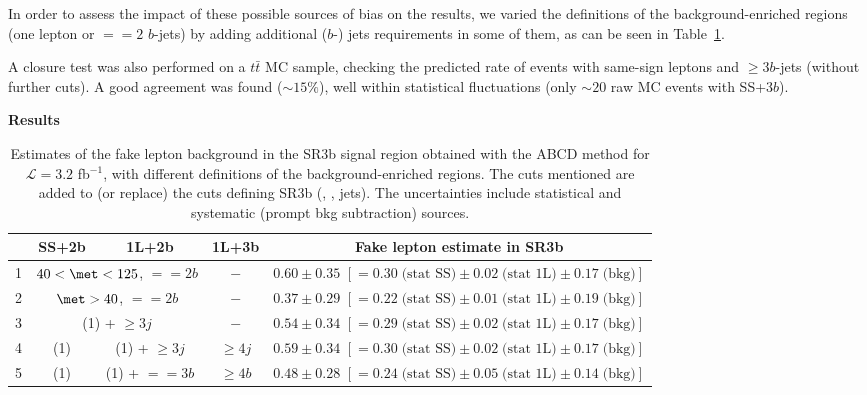 In order to assess the impact of these possible sources of bias on the results, 
we varied the definitions of the background-enriched regions (one lepton or $==2$ $b$-jets) 
by adding additional ($b$-) jets requirements in some of them, as can be seen in Table~\ref{tab:abcd_rates}. 

A closure test was also performed on a $t\bar t$ MC sample, checking the predicted rate of events 
with same-sign leptons and $\ge 3 b$-jets (without further cuts). 
A good agreement was found ($\sim 15\%$), well within statistical fluctuations (only $\sim 20$ raw MC events with SS+3$b$). 

\par{\bf Results\\}
\begin{table}[t!]
\centering
\begin{tabular}{c|c|c|c|c|}\hline
& SS+2b    & 1L+2b   &    1L+3b & Fake lepton estimate in SR3b\\\hline\hline
1 & \multicolumn{2}{c|}{$40<\met<125$, $==2b$} & $-$ & \textbf{$0.60 \pm 0.35$} $[=0.30\;\text{(stat SS)}\pm 0.02\;\text{(stat 1L)}\pm 0.17\;\text{(bkg)}]$\\\hline
2 & \multicolumn{2}{c|}{$\met>40$, $==2b$} & $-$ & \textbf{$0.37 \pm 0.29$} $[=0.22\;\text{(stat SS)}\pm 0.01\;\text{(stat 1L)}\pm 0.19\;\text{(bkg)}]$\\\hline
3 & \multicolumn{2}{c|}{(1) + $\ge 3j$} & $-$ & \textbf{$0.54 \pm 0.34$} $[=0.29\;\text{(stat SS)}\pm 0.02\;\text{(stat 1L)}\pm 0.17\;\text{(bkg)}]$\\\hline
4 & (1) & (1) + $\ge 3j$ & $\ge 4j$ & \textbf{$0.59 \pm 0.34$} $[=0.30\;\text{(stat SS)}\pm 0.02\;\text{(stat 1L)}\pm 0.17\;\text{(bkg)}]$\\\hline
5 & (1) & (1) + $==3b$ & $\ge 4 b$ & \textbf{$0.48 \pm 0.28$} $[=0.24\;\text{(stat SS)}\pm 0.05\;\text{(stat 1L)}\pm 0.14\;\text{(bkg)}]$\\\hline
\end{tabular}
\caption{Estimates of the fake lepton background in the SR3b signal region obtained with the ABCD method for $\mathcal L=3.2$ fb$^{-1}$, 
with different definitions of the background-enriched regions. 
The cuts mentioned are added to (or replace) the cuts defining SR3b (\met, \meff, jets). 
The uncertainties include statistical and systematic (prompt bkg subtraction) sources. }
\label{tab:abcd_rates}
\end{table}

